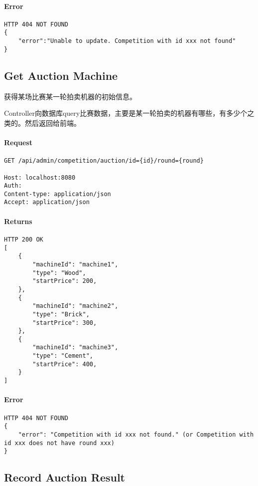 \documentclass{article}
\begin{document}
\paragraph*{Error}
\begin{lstlisting}
HTTP 404 NOT FOUND
{
    "error":"Unable to update. Competition with id xxx not found"
}
\end{lstlisting}

\subsection{Get Auction Machine}

获得某场比赛某一轮拍卖机器的初始信息。

Controller向数据库query比赛数据，主要是某一轮拍卖的机器有哪些，有多少个之类的。然后返回给前端。

\paragraph*{Request}
\begin{lstlisting}
GET /api/admin/competition/auction/id={id}/round={round}

Host: localhost:8080
Auth:
Content-type: application/json
Accept: application/json
\end{lstlisting}

\paragraph*{Returns}
\begin{lstlisting}
HTTP 200 OK
[
    {
        "machineId": "machine1",
        "type": "Wood",
        "startPrice": 200,
    },
    {
        "machineId": "machine2",
        "type": "Brick",
        "startPrice": 300,
    },
    {
        "machineId": "machine3",
        "type": "Cement",
        "startPrice": 400,
    }
]
\end{lstlisting}

\paragraph*{Error}
\begin{lstlisting}
HTTP 404 NOT FOUND
{
    "error": "Competition with id xxx not found." (or Competition with id xxx does not have round xxx)
}
\end{lstlisting}

\subsection{Record Auction Result}
\end{document}
